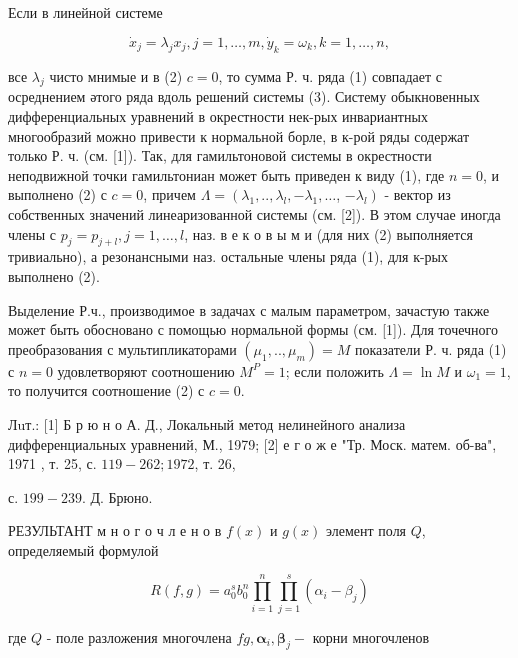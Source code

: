 \documentclass[10pt]{article}
\begin{document}
Если в линейной системе



\[

\dot{x}_{j}=\lambda_{j} x_{j}, j=1, \ldots, m, \dot{y}_{k}=\omega_{k}, k=1, \ldots, n,

\]



все $\lambda_{j}$ чисто мнимые и в (2) $c=0$, то сумма Р. ч. ряда (1) совпадает с осреднением әтого ряда вдоль решений системы (3). Систему обыкновенных дифференциальных уравнений в окрестности нек-рых инвариантных многообразий можно привести к нормальной борле, в к-рой ряды содержат только Р. ч. (см. [1]). Так, для гамильтоновой системы в окрестности неподвижной точки гамильтониан может быть приведен к виду (1), где $n=0$, и выполнено (2) с $c=0$, причем $\Lambda=\left(\lambda_{1}, . ., \lambda_{l},-\lambda_{1}, \ldots\right.$, $\left.-\lambda_{l}\right)$ - вектор из собственных значений линеаризованной системы (см. [2]). В этом случае иногда члены с $p_{j}=p_{j+l}, j=1, \ldots, l$, наз. в е к о в ы м и (для них (2) выполняется тривиально), а резонансными наз. остальные члены ряда (1), для к-рых выполнено (2).



Выделение Р.ч., производимое в задачах с малым параметром, зачастую также может быть обосновано с помощью нормальной формы (см. [1]). Для точечного преобразования с мультипликаторами $\left(\mu_{1}, . ., \mu_{m}\right)=M$ показатели Р. ч. ряда (1) с $n=0$ удовлетворяют соотношению $M^{P}=1$; если положить $\Lambda=\ln M$ и $\omega_{1}=1$, то получится соотношение (2) с $c=0$.



Лuт.: [1] Б р ю н о А. Д., Локальный метод нелинейного анализа дифференциальных уравнений, М., 1979; [2] е г о ж е "Тр. Моск. матем. об-ва", 1971 , т. 25, с. $119-262 ; 1972$, т. 26,

с. $199-239$. Д. Брюно.



РЕЗУЛЬТАНТ м н о г о ч л е н о в $f(x)$ и $g(x)$ элемент поля $Q$, определяемый формулой



\[

R(f, g)=a_{0}^{s} b_{0}^{n} \prod_{i=1}^{n} \prod_{j=1}^{s}\left(\alpha_{i}-\beta_{j}\right)

\]



где $Q$ - поле разложения многочлена $f g, \boldsymbol{\alpha}_{i}, \boldsymbol{\beta}_{j}-$ корни многочленов
\end{document}
